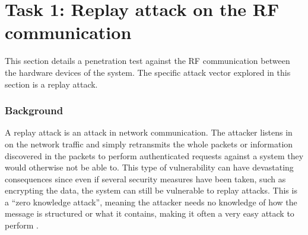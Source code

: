 \section{Task 1: Replay attack on the RF communication} \label{ch:pentesting:replay}
This section details a penetration test against the RF communication between the hardware devices of the system. The specific attack vector explored in this section is a replay attack.

\subsubsection{Background}
A replay attack is an attack in network communication. The attacker listens in on the network traffic and simply retransmits the whole packets or information discovered in the packets to perform authenticated requests against a system they would otherwise not be able to. This type of vulnerability can have devastating consequences since even if several security measures have been taken, such as encrypting the data, the system can still be vulnerable to replay attacks. This is a \enquote{zero knowledge attack}, meaning the attacker needs no knowledge of how the message is structured or what it contains, making it often a very easy attack to perform \cite{hacking-the-iot-talk}\cite{rf-exploitation-talk}.


